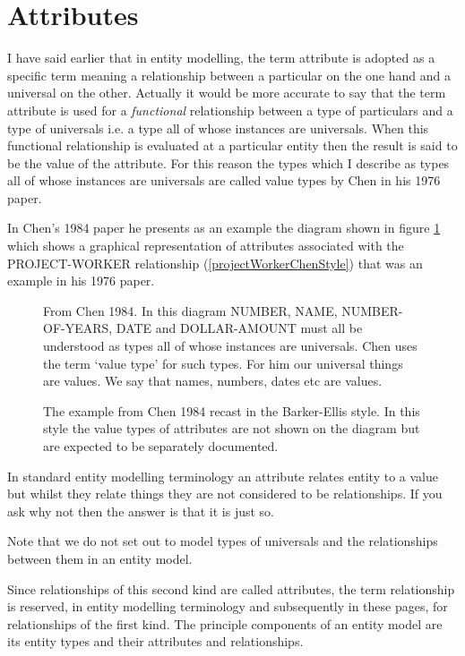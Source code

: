 

\section{Attributes}
\label{Attributes}
\mynote I have said earlier that in entity modelling, the term attribute is adopted as a specific term meaning a relationship between a particular on the one hand and a universal on the other. Actually it would be more accurate to say that the term attribute is used for a \textit{functional} relationship between a type of particulars and a type of universals i.e. a type all of whose instances are universals. When this functional relationship is evaluated at a particular entity then the result is said to be the value of the attribute. For this reason the types which I describe as types all of whose instances are universals are called value types by Chen in his  1976 paper.

\mynote
In Chen's 1984 paper he presents as an example the diagram shown in figure 
\ref{AttributesExampleFromChen1984} which shows a graphical representation of attributes associated with the PROJECT-WORKER relationship (\ref{projectWorkerChenStyle}) that was an example in his 1976 paper.
\begin{figure}

\caption{From Chen 1984. In this diagram NUMBER, NAME, NUMBER-OF-YEARS, DATE and DOLLAR-AMOUNT must all be understood as types all of whose instances are universals. Chen uses the term `value type' for such types. For him our universal things are values. We  say that names, numbers, dates etc are values.}
\label{AttributesExampleFromChen1984}
\end{figure}

\begin{figure}

\caption{The example from Chen 1984 recast in the Barker-Ellis style. In this style the value types of attributes are not shown on the diagram but are expected to be 
separately documented. }
\label{projectWorkerAttributesOurStyle}
\end{figure}

\mynote
In standard entity modelling terminology an attribute relates entity to a value but whilst they relate things they are not considered to be relationships. If you ask why not then the answer is that it is just so.
 
\mynote Note that we do not set out to model types of universals and the relationships between them in an entity model. 

\mynote Since relationships of this second kind are called attributes, the term relationship is reserved, in entity modelling terminology and subsequently in these pages, for relationships of the first kind.  The principle components of an entity model are its entity types and their attributes and relationships.


 

